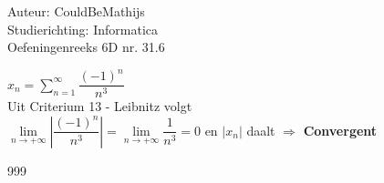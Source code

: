 \documentclass[a4paper]{article}
\newcommand{\llim}{\lim\limits}
\begin{document}
  
\noindent \large Auteur: CouldBeMathijs \\
\noindent \large Studierichting: Informatica\\
\noindent \large Oefeningenreeks 6D nr. 31.6\\

\medskip

\normalsize

$x_n = \displaystyle\sum_{n=1}^\infty \dfrac{(-1)^n}{n^3}$\\

Uit Criterium 13 - Leibnitz volgt\\

$\llim_{n\rightarrow+\infty} \left|\dfrac{(-1)^n}{n^3}\right|=\llim_{n\rightarrow+\infty} \dfrac{1}{n^3} = 0$ en $|x_n|$ daalt $\Rightarrow$ \textbf{Convergent}


\begin{thebibliography}{999}
\end{thebibliography}
\end{document}
